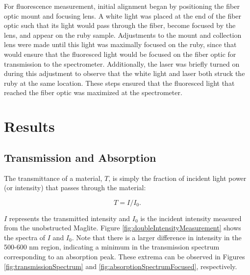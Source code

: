 \documentclass[11pt, a4paper, twocolumn]{article}
\begin{document}
For fluorescence measurement, initial alignment began by positioning the fiber optic mount and focusing lens. A white light was placed at the end of the fiber optic such that its light would pass through the fiber, become focused by the lens, and appear on the ruby sample. Adjustments to the mount and collection lens were made until this light was maximally focused on the ruby, since that would ensure that the fluoresced light would be focused on the fiber optic for transmission to the spectrometer. Additionally, the laser was briefly turned on during this adjustment to observe that the white light and laser both struck the ruby at the same location. These steps ensured that the fluoresced light that reached the fiber optic was maximized at the spectrometer.

\section*{Results}
\subsection*{Transmission and Absorption}

The transmittance of a material, $T$, is simply the fraction of incident light power (or intensity) that passes through the material:
\setlength{\abovedisplayskip}{8pt}
\setlength{\belowdisplayskip}{8pt}

\begin{equation}\label{eq1}
    T=I/I_0. 
\end{equation}

$I$ represents the transmitted intensity and $I_0$ is the incident intensity measured from the unobstructed Maglite. Figure \ref{fig:doubleIntensityMeasurement} shows the spectra of $I$ and $I_0$. Note that there is a larger difference in intensity in the 500-600 nm region, indicating a minimum in the transmission spectrum corresponding to an absorption peak. These extrema can be observed in Figures \ref{fig:transmissionSpectrum} and \ref{fig:absorptionSpectrumFocused},  respectively.
\end{document}
